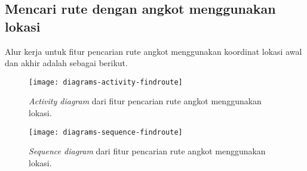 \subsection{Mencari rute dengan angkot menggunakan \latlon\xspace lokasi}
\label{sec:design-flow-findroute}

Alur kerja untuk fitur pencarian rute angkot menggunakan koordinat \latlon\xspace lokasi awal dan akhir adalah sebagai berikut.

\begin{figure}[h]
    \centering
    \texttt{[image: diagrams-activity-findroute]}
    \caption[\textit{Activity diagram} fitur pencarian rute angkot menggunakan koordinat lokasi]{\textit{Activity diagram} dari fitur pencarian rute angkot menggunakan \latlon\xspace lokasi.}
    \label{fig:diagrams-activity-findroute}
\end{figure}

\begin{figure}[h]
    \centering
    \texttt{[image: diagrams-sequence-findroute]}
    \caption[\textit{Sequence diagram} fitur pencarian rute angkot menggunakan koordinat lokasi]{\textit{Sequence diagram} dari fitur pencarian rute angkot menggunakan \latlon\xspace lokasi.}
    \label{fig:diagrams-sequence-findroute}
\end{figure}

